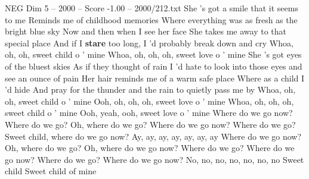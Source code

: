 \begin{textsample}{NEG Dim 5 – 2000 – Score -1.00 – 2000/212.txt}  \label{ex:f5_neg_037}
She 's got a smile that it seems to me Reminds me of childhood memories Where everything was as fresh as the bright blue sky Now and then when I see her face She takes me away to that special place And if I \textbf{stare} too long, I 'd probably break down and cry Whoa, oh, oh, sweet child o ' mine Whoa, oh, oh, oh, sweet love o ' mine She 's got eyes of the bluest skies As if they thought of rain I 'd hate to look into those eyes and see an ounce of pain Her hair reminds me of a warm safe place Where as a child I 'd hide And pray for the thunder and the rain to quietly pass me by Whoa, oh, oh, sweet child o ' mine Ooh, oh, oh, oh, sweet love o ' mine Whoa, oh, oh, oh, sweet child o ' mine Ooh, yeah, ooh, sweet love o ' mine Where do we go now?
Where do we go?
Oh, where do we go?
Where do we go now?
Where do we go?
Sweet child, where do we go now?
Ay, ay, ay, ay, ay, ay, ay Where do we go now?
Oh, where do we go?
Oh, where do we go now?
Where do we go?
Where do we go now?
Where do we go?
Where do we go now?
No, no, no, no, no, no, no Sweet child Sweet child of mine

\end{textsample}

